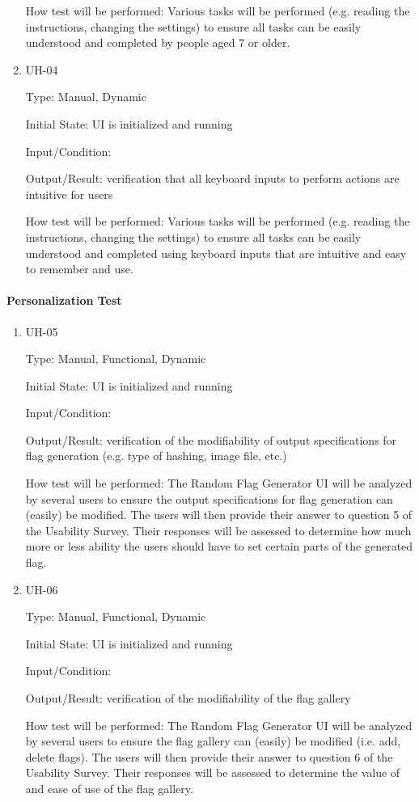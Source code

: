 \documentclass[12pt, titlepage]{article}
\begin{document}
\begin{enumerate}
How test will be performed: Various tasks will be performed (e.g. reading the
instructions, changing the settings) to ensure all tasks can be easily
understood and completed by people aged 7 or older.

\item{UH-04\\}

Type: Manual, Dynamic

Initial State: UI is initialized and running

Input/Condition: 

Output/Result: verification that all keyboard inputs to perform actions are
intuitive for users

How test will be performed: Various tasks will be performed (e.g. reading the
instructions, changing the settings) to ensure all tasks can be easily
understood and completed using keyboard inputs that are intuitive and easy to
remember and use.

\end{enumerate}

\paragraph{Personalization Test}

\begin{enumerate}

\item{UH-05\\}

Type: Manual, Functional, Dynamic

Initial State: UI is initialized and running

Input/Condition: 

Output/Result: verification of the modifiability of output specifications for
flag generation (e.g. type of hashing, image file, etc.)

How test will be performed: The Random Flag Generator UI will be analyzed by
several users to ensure the output specifications for flag generation can
(easily) be modified. The users will then provide their answer to question 5
of the Usability Survey. Their responses will be assessed to determine how
much more or less ability the users should have to set certain parts of the
generated flag.

\item{UH-06\\}

Type: Manual, Functional, Dynamic

Initial State: UI is initialized and running

Input/Condition: 

Output/Result: verification of the modifiability of the flag gallery

How test will be performed: The Random Flag Generator UI will be analyzed by
several users to ensure the flag gallery can (easily) be modified (i.e. add,
delete flags). The users will then provide their answer to question 6 of the
Usability Survey. Their responses will be assessed to determine the value of
and ease of use of the flag gallery.

\end{enumerate}
\end{document}
